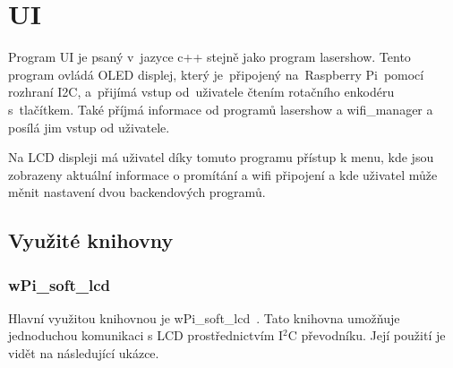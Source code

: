 \section{UI}
Program UI je psaný v~jazyce c++ stejně jako program lasershow. Tento program ovládá OLED displej, který je~připojený na~Raspberry Pi~pomocí rozhraní I2C, a~přijímá vstup od~uživatele čtením rotačního enkodéru s~tlačítkem. Také příjmá informace od programů lasershow a wifi\_manager a posílá jim vstup od uživatele.

Na LCD displeji má uživatel díky tomuto programu přístup k menu, kde jsou zobrazeny aktuální informace o promítání a wifi připojení a kde uživatel může měnit nastavení dvou backendových programů.


\subsection{Využité knihovny}
\subsubsection{wPi\_soft\_lcd}
Hlavní využitou knihovnou je wPi\_soft\_lcd~\cite{wpi-lcd}. Tato knihovna umožňuje jednoduchou komunikaci s LCD prostřednictvím I$^{2}$C převodníku. Její použití je vidět na následující ukázce.

\inputminted[frame=lines,fontsize=\footnotesize{}, linenos, breaklines]{cpp}{code_examples/soft_lcd.cpp}

